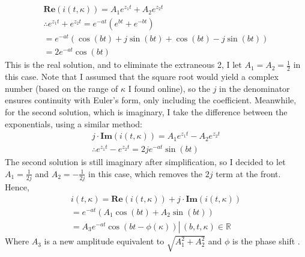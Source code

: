 \documentclass[12pt]{article}
\numberwithin{equation}{section}
\begin{document}
\begin{gather*}
    \textbf{Re}(i(t, \kappa)) = A_1e^{z_1 t} + A_2e^{z_2 t} \\
    \therefore e^{z_1 t} + e^{z_2 t} =  e^{-at}\left(e^{b{t}} + e^{-bt}\right)\\
   = e^{-at} \left( \cos(bt) + j\sin(bt) + \cos( bt) - j\sin( bt) \right)\\
    = 2e^{-at} \cos(bt)
\end{gather*}
This is the real solution, and to eliminate the extraneous 2, I let $A_1 = A_2 = \frac{1}{2}$ in this case. Note that I assumed that the square root would yield a complex number (based on the range of $\kappa$ I found online), so the $j$ in the denominator ensures continuity with Euler's form, only including the coefficient. Meanwhile, for the second solution, which is imaginary, I take the difference between the exponentials, using a similar method:
\begin{gather*}
    j \cdot \textbf{Im}(i(t, \kappa)) = A_1e^{z_1 t} - A_2e^{z_2 t} \\
    \therefore e^{z_1 t} - e^{z_2 t} = 2j e^{-at} \sin(bt)
\end{gather*}
The second solution is still imaginary after simplification, so I decided to let $A_1 = \frac{1}{2j} $ and $A_2 = -\frac{1}{2j}$ in this case, which removes the $2j$ term at the front. Hence,
\begin{gather*}
    i(t,\kappa) =   \textbf{Re}(i(t, \kappa)) + j \cdot \textbf{Im}(i(t, \kappa))\\
    =   e^{-at} \left( A_1\cos(bt) + A_2\sin(bt) \right) \\ 
   = \left. A_3 e^{-at} \cos(bt - \phi(\kappa)) \right\vert \, (b, t,\kappa) \in \mathbb{R}
\end{gather*}
Where $A_3$ is a new amplitude equivalent to $\sqrt{A_1 ^2 + A_2 ^2}$ and $\phi$ is the phase shift .
\end{document}
